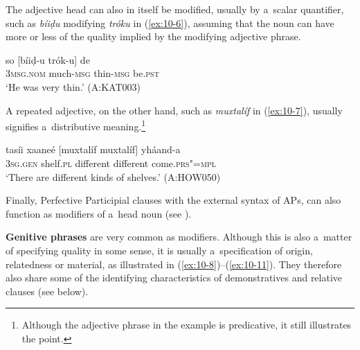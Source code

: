 The adjective head can also in itself be modified, usually by a~scalar quantifier, such as \textit{bíiḍu} modifying \textit{tróku} in (\ref{ex:10-6}), assuming that the noun can have more or less of the quality implied by the modifying adjective phrase. 

\begin{exe}
\ex
\label{ex:10-6}
\gll so [bíiḍ-u trók-u] de \\
\textsc{3msg.nom} much-\textsc{msg} thin-\textsc{msg} be.\textsc{pst} \\
\glt `He was very thin.' (A:KAT003)
\end{exe}

A repeated adjective, on the other hand, such as \textit{muxtalíf} in (\ref{ex:10-7}), usually signifies a~distributive meaning.\footnote{Although the adjective phrase in the example is predicative, it still illustrates the point.}

\begin{exe}
\ex
\label{ex:10-7}
\gll tasíi xaaneé [muxtalíf muxtalíf] yháand-a \\
\textsc{3sg.gen} shelf.\textsc{pl} different different come.\textsc{prs"=mpl} \\
\glt `There are different kinds of shelves.' (A:HOW050)
\end{exe}

Finally, Perfective Participial clauses with the external syntax of APs, can also function as modifiers of a~head noun (see ). 


\textbf{Genitive phrases} are very common as modifiers. Although this is also a~matter of specifying quality in some
sense, it is usually a~specification of origin, relatedness or material, as illustrated in
(\ref{ex:10-8})--(\ref{ex:10-11}). They therefore
also share some of the identifying characteristics of demonstratives and relative clauses (see
below).

